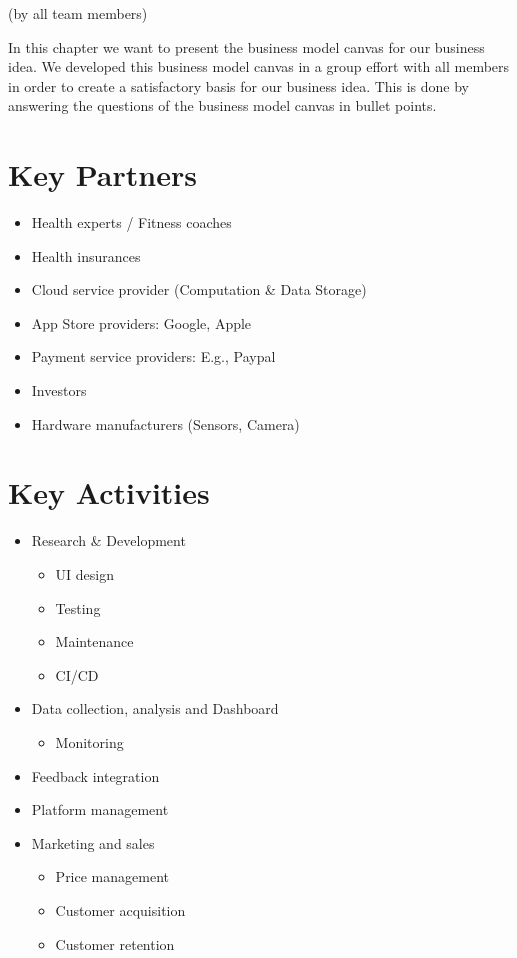 (by all team members)

\p
In this chapter we want to present the business model canvas for our business idea.
We developed this business model canvas in a group effort with all members in order to create a satisfactory basis for our business idea.
This is done by answering the questions of the business model canvas in bullet points.

\section{Key Partners}
\begin{itemize}
    \item Health experts / Fitness coaches
    \item Health insurances
    \item Cloud service provider (Computation \& Data Storage)
    \item App Store providers: Google, Apple
    \item Payment service providers: E.g., Paypal
    \item Investors
    \item Hardware manufacturers (Sensors, Camera)
\end{itemize}

\section{Key Activities}
\begin{itemize}
    \item Research \& Development
        \begin{itemize}
            \item UI design
            \item Testing
            \item Maintenance
            \item CI/CD
        \end{itemize}
    \item Data collection, analysis and Dashboard
        \begin{itemize}
            \item Monitoring
        \end{itemize}
    \item Feedback integration
    \item Platform management
    \item Marketing and sales
        \begin{itemize}
            \item Price management
            \item Customer acquisition
            \item Customer retention
        \end{itemize}
\end{itemize}

